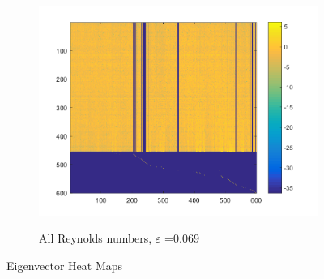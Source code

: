 \documentclass[letterpaper,12pt,peerreviewca,draftcls]{IEEEtran}
\begin{document}
\begin{figure}[h]
\begin{subfigure}[t]{0.5\textwidth}
		\includegraphics[width=\linewidth]{"Figure S9c"}
		\label{fig:eigenall}
		\caption{All Reynolds numbers, $\varepsilon$ =0.069}
	\end{subfigure}
	\caption{Eigenvector Heat Maps}
\end{figure}
\end{document}
